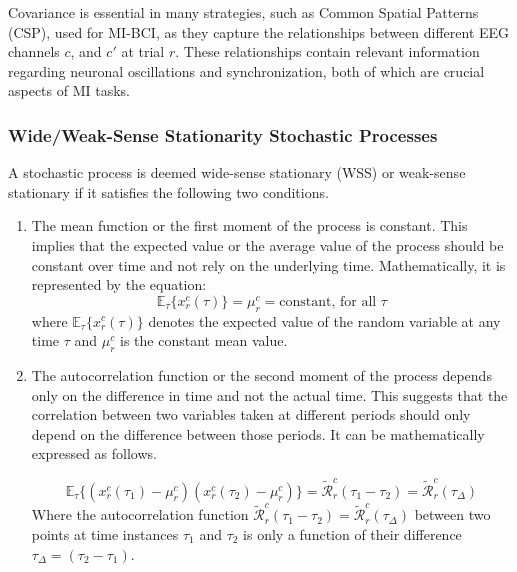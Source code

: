 \documentclass[runningheads]{llncs}
\newenvironment{reviewer}{\setcounter{pointcounter}{1}}{}
\newcommand{\changes}[1]{\textcolor[rgb]{1.00,0.00,0.00}{#1}}
\begin{document}
\begin{reviewer}
{        \changes{
        Covariance is essential in many strategies, such as Common Spatial Patterns (CSP), used for MI-BCI, as they capture the relationships between different EEG channels $c$, and $c'$ at trial $r$.} These relationships contain relevant information regarding neuronal oscillations and synchronization, both of which are crucial aspects of MI tasks. 
        
        \subsubsection{Wide/Weak-Sense Stationarity Stochastic Processes}
        
        A stochastic process is deemed wide-sense stationary (WSS) or weak-sense stationary if it satisfies the following two conditions.
        
        \begin{enumerate}
            \item The mean function or the first moment of the process is constant. This implies that the expected value or the average value of the process should be constant over time and not rely on the underlying time. Mathematically, it is represented by the equation:
            \changes{
            \begin{equation}
                \mathbb{E}_{\tau}\{x^{c}_{r}(\tau)\} = \mu^{c}_{r} = \text{constant, for all } \tau
            \end{equation}
            where $\mathbb{E}_{\tau}\{x^{c}_{r}(\tau)\}$ denotes the expected value of the random variable at any time $\tau$ and $\mu^{c}_{r}$ is the constant mean value.}
        
            \item The autocorrelation function or the second moment of the process depends only on the difference in time and not the actual time. This suggests that the correlation between two variables taken at different periods should only depend on the difference between those periods. It can be mathematically expressed as follows.
        
            \changes{
            \begin{equation}
                \mathbb{E}_{\tau}\{(x^{c}_{r}(\tau_1)-\mu^{c}_{r})(x^{c}_{r}(\tau_2)-\mu^{c}_{r})\} = \mathcal{\tilde{R}}^{c}_{r}(\tau_1 - \tau_2) = \mathcal{\tilde{R}}^{c}_{r}(\tau_{\Delta})
            \end{equation}
            Where the autocorrelation function $\mathcal{\tilde{R}}^{c}_{r}(\tau_1 - \tau_2) = \mathcal{\tilde{R}}^{c}_{r}(\tau_{\Delta})$ between two points at time instances $\tau_1$ and $\tau_2$ is only a function of their difference $\tau_{\Delta}=(\tau_2 - \tau_1)$.}
        \end{enumerate}
        
}
\end{reviewer}
\end{document}
